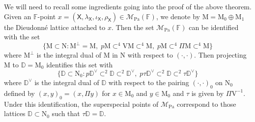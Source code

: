 \documentclass[10pt]{amsart}
\numberwithin{equation}{section}
\theoremstyle{definition}
\def\Pa{\mathrm{Pa}}
\def\calM{\mathcal{M}}
\def\DD{\mathbb{D}}
\def\FF{\mathbb{F}}
\def\sfX{\mathsf{X}}
\def\rmM{\mathrm{M}}
\def\rmN{\mathrm{N}}
\def\rmV{\mathrm{V}}
\begin{document}
We will need to recall some ingredients going into the proof of the above theorem. Given an $\FF$-point $x=(\sfX, \lambda_{\sfX}, \iota_{\sfX}, \rho_{\sfX} )\in\calM_{\Pa}(\FF)$, we denote by $\mathrm{M}=\mathrm{M}_{0}\oplus\mathrm{M}_{1}$ the Dieudonn\'{e} lattice attached to $x$. Then the set $\calM_{\Pa}(\FF)$ can be identified with the set  
\begin{equation*}
\{\rmM\subset \rmN: \rmM^{\perp}=\rmM,\phantom{.}p\rmM\subset^{4} \rmV\rmM\subset^{4} \rmM,\phantom{.}p\rmM\subset^{4} \Pi \rmM\subset^{4} \rmM\}
\end{equation*}
where $\rmM^{\perp}$ is the integral dual of $\rmM$ in $\rmN$ with respect to $(\cdot, \cdot)$.  Then projecting $\rmM$ to $\mathbb{D}=\rmM_{0}$ identifies this set with 
\begin{equation}\label{RZ-F-point}
\{\DD \subset \rmN_{0}:p\DD^{\vee} \subset^{2} \DD\subset^{2} \DD^{\vee},\phantom{.}p\tau\DD^{\vee}\subset^{2} \DD\subset^{2} \tau\DD^{\vee}\}
\end{equation}
where $\DD^{\vee}$ is the integral dual of $\DD$ with respect to the pairing $(\cdot, \cdot)_{0}$ on $\rmN_{0}$ defined by $(x, y)_{0}=(x, \Pi y)$ for $x\in \rmM_{0}$ and $y\in \rmM_{0}$ and $\tau$ is given by $\Pi\rmV^{-1}$. Under this identification, the superspecial points of $\calM_{\Pa}$ correspond to those lattices $\DD\subset\rmN_{0}$ such that $\tau\DD=\DD$.
\end{document}
